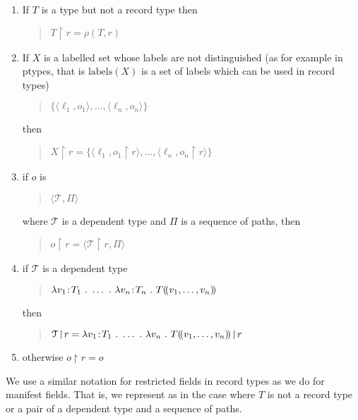 \begin{enumerate} 
 
\item If $T$ is a type but not a record type then
  \begin{quote}
    $T\!\restriction\!r=\rho(T,r)$
  \end{quote}
  
 
\item If $X$ is a labelled set whose labels are not distinguished (as
  for example in ptypes, that is $\mathrm{labels}(X)$ is a set of
  labels which can be used in record types)
  \begin{quote}
    $\{\langle\ell_1,o_1\rangle,\ldots,\langle\ell_n,o_n\rangle\}$
  \end{quote}
  then
  \begin{quote}
    $X\!\restriction\!r=\{\langle\ell_1,o_1\!\restriction\!r\rangle,\ldots,\langle\ell_n,o_n\!\restriction\!r\rangle\}$
  \end{quote}

  
\item if $o$ is
  \begin{quote}
    $\langle\mathcal{T},\Pi\rangle$
  \end{quote}
  where $\mathcal{T}$ is
  a dependent type and $\Pi$ is a sequence of paths, then
  \begin{quote}
    $o\!\restriction\!r=\langle\mathcal{T}\!\restriction\!r,\Pi\rangle$
  \end{quote}
  
\item if $\mathcal{T}$ is a dependent type
  \begin{quote}
    $\lambda v_1\!:\!T_1\ .\ \ldots\ .\ \lambda v_n\!:\!T_n\ .\
    T(\!(v_1,\ldots,v_n)\!)$
  \end{quote}
  then
  \begin{quote}
    $\mathcal{T}\!\restriction\!r=\lambda v_1\!:\!T_1\ .\ \ldots\ .\
    \lambda v_n\ .\ T\dep{v_1,\ldots,v_n}\!\restriction\!r$
  \end{quote}
  
\item otherwise $o\!\restriction\!r=o$
 
\end{enumerate} 

  
  
We use a similar notation for restricted fields in record types as we
do for manifest fields.  That is, we represent  as
\nexteg{b} in the case where $T$ is not a record type or a pair of a
dependent type and a sequence of paths.
\begin{ex} 
\begin{subex} 
 
\item {} 
 
\item {} 
 
\end{subex} 
   
\end{ex}


